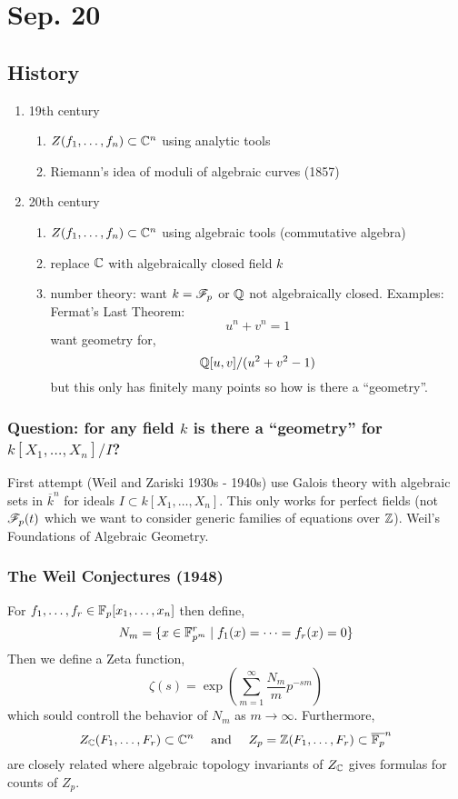 \documentclass[12pt]{article}
\begin{document}
\section{Sep. 20}

\subsection{History}

\begin{enumerate}
\item 19th century
\begin{enumerate}
\item $Z(f_1, \dots, f_n) \subset \mathbb{C}^n$ using analytic tools
\item Riemann's idea of moduli of algebraic curves (1857)
\end{enumerate}
\item 20th century
\begin{enumerate}
\item $Z(f_1, \dots, f_n) \subset \mathbb{C}^n$ using algebraic tools (commutative algebra)
\item replace $\mathbb{C}$ with algebraically closed field $k$
\item number theory: want $k = \mathscr{F}_p$ or $\mathbb{Q}$ not algebraically closed. Examples: Fermat's Last Theorem:
\[ u^n + v^n = 1 \]
want geometry for,
\[ \mathbb{Q}[u,v]/(u^2 + v^2 - 1) \]
but this only has finitely many points so how is there a ``geometry''. 
\end{enumerate}
\end{enumerate}

\subsubsection{Question: for any field $k$ is there a ``geometry'' for $k[X_1, \dots, X_n]/I$?}

First attempt (Weil and Zariski 1930s - 1940s) use Galois theory with algebraic sets in $\overline{k}^n$ for ideals $I \subset k[X_1, \dots, X_n]$. This only works for perfect fields (not $\mathscr{F}_p(t)$ which we want to consider generic families of equations over $\mathbb{Z}$). Weil's Foundations of Algebraic Geometry.

\subsubsection{The Weil Conjectures (1948)}

For $f_1, \dots, f_r \in \mathbb{F}_p[x_1, \dots, x_n]$ then define,
\[ N_m = \{ x \in \mathbb{F}_{p^m}^r \mid f_1(x) = \cdots = f_r(x) = 0 \} \]
Then we define a Zeta function,
\[ \zeta(s) = \exp{ \left( \sum_{m = 1}^\infty \frac{N_m}{m} p^{-sm} \right) } \]
which sould controll the behavior of $N_m$ as $m \to \infty$. Furthermore,
\[ Z_{\mathbb{C}}(F_1, \dots, F_r) \subset \mathbb{C}^n \quad \text{ and } \quad Z_p = \mathbb{Z}(F_1, \dots, F_r) \subset \overline{\mathbb{F}_p}^n \]
are closely related where algebraic topology invariants of $Z_{\mathbb{C}}$ gives formulas for counts of $Z_p$. 
\end{document}
